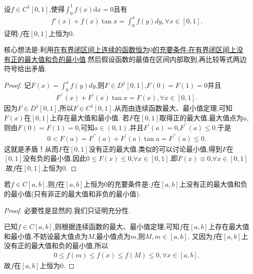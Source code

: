 \documentclass[lang=cn,newtx,10pt,scheme=chinese]{../Template/elegantbook}
\begin{document}
\begin{example}
设$f\in C^1\left[ 0,1 \right] $,使得$\int_0^1{f\left( x \right) \mathrm{d}x}=0$且有
\begin{align*}
f'\left( x \right) +f\left( x \right) \tan x=\int_0^x{f\left( y \right) dy,\forall x\in \left[ 0,1 \right] .}
\end{align*}
证明:$f$在$[0,1]$上恒为$0$.
\end{example}
\begin{note}
核心想法是:利用\hyperref[conclusion:在有界闭区间上连续的函数恒为$0$的充要条件:在有界闭区间上没有正的最大值和负的最小值]{在有界闭区间上连续的函数恒为$0$的充要条件:在有界闭区间上没有正的最大值和负的最小值}.然后假设函数的最值在区间内部取到,再比较等式两边符号给出矛盾.
\end{note}
\begin{proof}
记\(F(x) = \int_{0}^{x}f(y)dy\),则\(F \in D^1[0,1]\),\(F(0) = F(1) = 0\)并且
\begin{align*}
F^{\prime\prime}(x) + F^{\prime}(x)\tan x = F(x),\forall x \in [0,1].
\end{align*}
因为\(F \in D^1[0,1]\),所以\(F \in C^1[0,1]\).从而由连续函数最大、最小值定理,可知\(F(x)\)在\([0,1]\)上存在最大值和最小值.
若\(F\)在\([0,1]\)取得正的最大值,最大值点为\(a\),则由\(F(0) = F(1) = 0\),可知\(a \in (0,1)\).并且\(F^{\prime}(a) = 0\),\(F^{\prime\prime}(a) \leqslant 0\).于是
\begin{align*}
0 < F(a) = F^{\prime\prime}(a) + F^{\prime}(a)\tan a = F^{\prime\prime}(a) \leqslant 0.
\end{align*}
这就是矛盾！从而\(F\)在\([0,1]\)没有正的最大值.类似的可以讨论最小值,得到\(F\)在\([0,1]\)没有负的最小值.因此\(0 \leqslant F(x) \leqslant 0\),\(\forall x \in [0,1]\).即\(F(x) \equiv 0\),\(\forall x \in [0,1]\).故\(f\)在\([0,1]\)上恒为\(0\). 

\end{proof}
\begin{conclusion}\label{conclusion:在有界闭区间上连续的函数恒为$0$的充要条件:在有界闭区间上没有正的最大值和负的最小值}
若$f\in C[a,b]$,则$f$在$[a,b]$上恒为$0$的充要条件是:$f$在$[a,b]$上没有正的最大值和负的最小值(只有非正的最大值和非负的最小值).
\begin{proof}
必要性是显然的.我们只证明充分性.

已知$f\in C[a,b]$,则根据连续函数的最大、最小值定理,可知$f$在$[a,b]$上存在最大值和最小值.不妨设最大值点为$M$,最小值点为$m$,则$M,m\in[a,b]$.
又因为$f$在$[a,b]$上没有正的最大值和负的最小值,所以
\begin{align*}
0\leqslant  f(m)\leqslant  f(x)\leqslant  f(M)\leqslant  0,\forall x\in[a,b].
\end{align*}
故$f$在$[a,b]$上恒为$0$.

\end{proof}
\end{conclusion}
\end{document}
